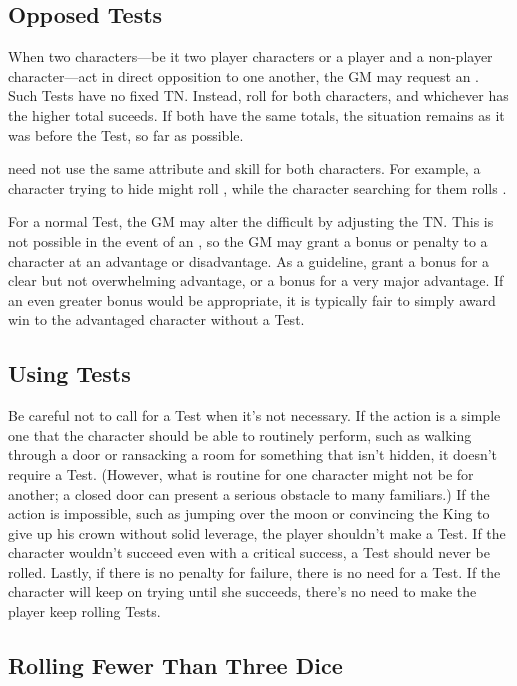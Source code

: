 \subsection{Opposed Tests}

When two characters---be it two player characters or a player and a non-player character---act in direct opposition to one another, the GM may request an {\opposedtest}.
Such Tests have no fixed TN.
Instead, roll for both characters, and whichever has the higher total suceeds.
If both have the same totals, the situation remains as it was before the Test, so far as possible.

{\opposedtests} need not use the same attribute and skill for both characters.
For example, a character trying to hide might roll , while the character searching for them rolls .

For a normal Test, the GM may alter the difficult by adjusting the TN.
This is not possible in the event of an {\opposedtest}, so the GM may grant a bonus or penalty to a character at an advantage or disadvantage.
As a guideline, grant a  bonus for a clear but not overwhelming advantage, or a  bonus for a very major advantage.
If an even greater bonus would be appropriate, it is typically fair to simply award win to the advantaged character without a Test.

\subsection{Using Tests}

Be careful not to call for a Test when it's not necessary.
If the action is a simple one that the character should be able to routinely perform, such as walking through a door or ransacking a room for something that isn't hidden, it doesn't require a Test.
(However, what is routine for one character might not be for another; a closed door can present a serious obstacle to many familiars.)
If the action is impossible, such as jumping over the moon or convincing the King to give up his crown without solid leverage, the player shouldn't make a Test.
If the character wouldn't succeed even with a critical success, a Test should never be rolled.
Lastly, if there is no penalty for failure, there is no need for a Test.
If the character will keep on trying until she succeeds, there's no need to make the player keep rolling Tests.

\subsection{Rolling Fewer Than Three Dice}


